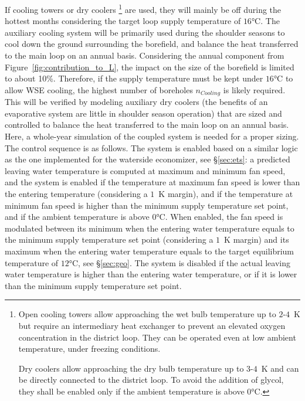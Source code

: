 If cooling towers or dry coolers%
\footnote{
Open cooling towers allow approaching the wet bulb temperature up to $2$-$4$~K but require an intermediary heat exchanger to prevent an elevated oxygen concentration in the district loop. They can be operated even at low ambient temperature, under freezing conditions.

Dry coolers allow approaching the dry bulb temperature up to $3$-$4$~K and can be directly connected to the district loop. To avoid the addition of glycol, they shall be enabled only if the ambient temperature is above $0$°C.
}
are used, they will mainly be off during the hottest months considering the target loop supply temperature of $16$°C.
The auxiliary cooling system will be primarily used during the shoulder seasons to cool down the ground surrounding the borefield, and balance the heat transferred to the main loop on an annual basis.
Considering the annual component from Figure~\ref{fig:contribution_to_L}, the impact on the size of the borefield is limited to about 10\%. Therefore, if the supply temperature must be kept under $16$°C to allow WSE cooling, the highest number of boreholes $n_{Cooling}$ is likely required. This will be verified by modeling auxiliary dry coolers (the benefits of an evaporative system are little in shoulder season operation) that are sized and controlled to balance the heat transferred to the main loop on an annual basis.
Here, a whole-year simulation of the coupled system is needed for a proper sizing. The control sequence is as follows.
The system is enabled based on a similar logic as the one implemented for the waterside economizer, see §\ref{sec:ets}: a predicted leaving water temperature is computed at maximum and minimum fan speed, and  the system is enabled if the temperature at maximum fan speed is lower than the entering temperature (considering a $1$~K margin), and if the temperature at minimum fan speed is higher than the minimum supply temperature set point, and if the ambient temperature is above $0$°C.
When enabled, the fan speed is modulated between its minimum when the entering water temperature equals to the minimum supply temperature set point (considering a $1$~K margin) and its maximum when the entering water temperature equals to the target equilibrium temperature of $12$°C, see §\ref{sec:geo}.
The system is disabled if the actual leaving water temperature is higher than the entering water temperature, or if it is lower than the minimum supply temperature set point.

